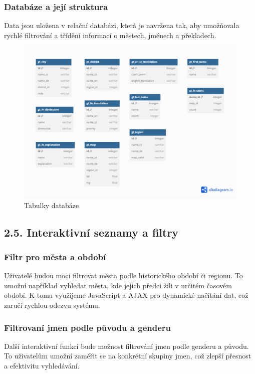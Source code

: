\documentclass[12pt]{report}
\begin{document}
\subsubsection{Databáze a její struktura}
Data jsou uložena v relační databázi, která je navržena tak, aby umožňovala rychlé filtrování a třídění informací o městech, jménech a překladech.

\begin{figure}[h!]
    \centering
    \includegraphics[width=\textwidth]{datagram.png}
    \caption{Tabulky databáze}
    \label{fig:obrazek}
\end{figure}


\subsection{2.5. Interaktivní seznamy a filtry}

\subsubsection{Filtr pro města a období}
Uživatelé budou moci filtrovat města podle historického období či regionu. To umožní například vyhledat města, kde jejich předci žili v určitém časovém období. K tomu využijeme JavaScript a AJAX pro dynamické načítání dat, což zaručí rychlou odezvu systému.

\subsubsection{Filtrovaní jmen podle původu a genderu}
Další interaktivní funkcí bude možnost filtrování jmen podle genderu a původu. To uživatelům umožní zaměřit se na konkrétní skupiny jmen, což zlepší přesnost a efektivitu vyhledávání.
\end{document}
